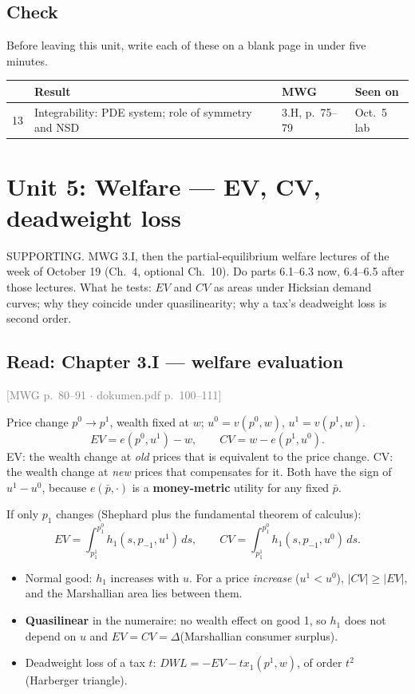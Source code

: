 \documentclass[11pt]{article}
\newcommand{\mwg}[2]{\hfill{\small\textcolor{gray}{[MWG p.~#1 $\cdot$ dokumen.pdf p.~#2]}}}
\begin{document}
\subsection{Check}
Before leaving this unit, write each of these on a blank page in under five minutes.
\begin{center}\small\begin{tabular}{rp{7.4cm}p{3.3cm}p{3.1cm}}\toprule & Result & MWG & Seen on\\\midrule
13 & Integrability: PDE system; role of symmetry and NSD & 3.H, p.~75--79 & Oct.~5 lab\\
\bottomrule\end{tabular}\end{center}

\clearpage
\section{Unit 5: Welfare --- EV, CV, deadweight loss}
\begin{unit}{SUPPORTING. MWG 3.I, then the partial-equilibrium welfare lectures of the week of October 19 (Ch.~4, optional Ch.~10). Do parts 6.1--6.3 now, 6.4--6.5 after those lectures.}
What he tests: $EV$ and $CV$ as areas under Hicksian demand curves; why they coincide under quasilinearity; why a tax's deadweight loss is second order.
\end{unit}
\subsection{Read: Chapter 3.I --- welfare evaluation}
\mwg{80--91}{100--111}

Price change $p^0\to p^1$, wealth fixed at $w$; $u^0=v(p^0,w)$, $u^1=v(p^1,w)$.
\[
EV=e(p^0,u^1)-w,\qquad CV=w-e(p^1,u^0).
\]
EV: the wealth change at \emph{old} prices that is equivalent to the price change. CV: the wealth change at \emph{new} prices that compensates for it. Both have the sign of $u^1-u^0$, because $e(\bar p,\cdot)$ is a \textbf{money-metric} utility for any fixed $\bar p$.

If only $p_1$ changes (Shephard plus the fundamental theorem of calculus):
\[
EV=\int_{p_1^1}^{p_1^0}h_1(s,p_{-1},u^1)\,ds,\qquad CV=\int_{p_1^1}^{p_1^0}h_1(s,p_{-1},u^0)\,ds .
\]
\begin{itemize}
\item Normal good: $h_1$ increases with $u$. For a price \emph{increase} ($u^1<u^0$), $|CV|\ge|EV|$, and the Marshallian area lies between them.
\item \textbf{Quasilinear} in the numeraire: no wealth effect on good 1, so $h_1$ does not depend on $u$ and $EV=CV=\Delta$(Marshallian consumer surplus).
\item Deadweight loss of a tax $t$: $DWL=-EV-tx_1(p^1,w)$, of order $t^2$ (Harberger triangle).
\end{itemize}
\end{document}

